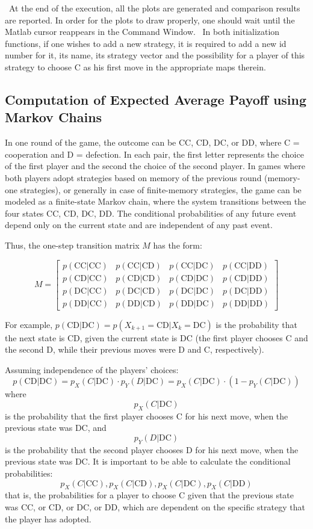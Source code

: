\documentclass[12pt]{article}
\begin{document}
\
At the end of the execution, all the plots are generated and comparison results are reported. In order for the plots to draw properly, one should wait until the Matlab cursor reappears in the Command Window. 
\
In both initialization functions, if one wishes to add a new strategy, it is required to add a new id number for it, its name, its strategy vector and the possibility for a player of this strategy to choose C as his first move in the appropriate maps therein.

\subsection{Computation of Expected Average Payoff using Markov Chains}
In one round of the game, the outcome can be CC, CD, DC, or DD, where C = cooperation and D = defection. In each pair, the first letter represents the choice of the first player and the second the choice of the second player. In games where both players adopt strategies based on memory of the previous round (memory-one strategies), or generally in case of finite-memory strategies, the game can be modeled as a finite-state Markov chain, where the system transitions between the four states CC, CD, DC, DD. The conditional probabilities of any future event depend only on the current state and are independent of any past event.

Thus, the one-step transition matrix \( M \) has the form:

\[
M =
\begin{bmatrix}
p(\text{CC}|\text{CC}) & p(\text{CC}|\text{CD}) & p(\text{CC}|\text{DC}) & p(\text{CC}|\text{DD}) \\
p(\text{CD}|\text{CC}) & p(\text{CD}|\text{CD}) & p(\text{CD}|\text{DC}) & p(\text{CD}|\text{DD}) \\
p(\text{DC}|\text{CC}) & p(\text{DC}|\text{CD}) & p(\text{DC}|\text{DC}) & p(\text{DC}|\text{DD}) \\
p(\text{DD}|\text{CC}) & p(\text{DD}|\text{CD}) & p(\text{DD}|\text{DC}) & p(\text{DD}|\text{DD})
\end{bmatrix}
\]




For example, \( p(\text{CD}|\text{DC}) = p(X_{k+1} = \text{CD} | X_k = \text{DC}) \) is the probability that the next state is CD, given the current state is DC (the first player chooses C and the second D, while their previous moves were D and C, respectively).

Assuming independence of the players' choices:
\[
p(\text{CD}|\text{DC}) = p_X(C|\text{DC}) \cdot p_Y(D|\text{DC}) = p_X(C|\text{DC}) \cdot (1 - p_Y(C|\text{DC}))
\]
where \[
 p_X(C|\text{DC}) 
\]
is the probability that the first player chooses C for his next move, when the previous state was DC, and 
\[
 p_Y(D|\text{DC}) 
\]
is the probability that the second player chooses D for his next move, when the previous state was DC. It is important to be able to calculate  the conditional probabilities: \[
p_X(C|\text{CC}) ,p_X(C|\text{CD}), p_X(C|\text{DC}), p_X(C|\text{DD}) 
\]
that is, the probabilities for a player to choose C given that the previous state was CC, or CD, or DC, or DD, which are dependent on the specific strategy that the player has adopted.
\end{document}
